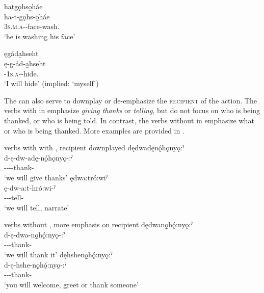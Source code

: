 \ea\label{ex:rflsrfex6} 
\ea hatgǫhso̱háe\\
\gll ha-t-gǫhs-o̱háe\\
 \textsc{3s.m.a}-{\semireflexive}-face-wash.{\habitual}\\
\glt `he is washing his face'


\ex ęgáda̱hseht\\
\gll ę-g-ád-a̱hseht\\
\fut-\textsc{1s.a}-{\semireflexive}-hide.{\zeropunctual}\\
\glt ‘I will hide’ (implied: ‘myself’)\\

\z
\z

The  \textsc{\semireflexive} can also serve to downplay or de-emphasize the \textsc{recipient} of the action. The verbs with  in  emphasize \emph{giving thanks} or \emph{telling}, but do not focus on who is being thanked, or who is being told. In contrast, the verbs without  in  emphasize what or who is being thanked. More examples are provided in .
	
\ea\label{ex:rflsrfex10} verbs with with  {\semireflexive}, recipient downplayed
\ea dędwadęnǫ́hǫnyǫ:ˀ\\
\gll d-ę-dw-adę-nǫ́hǫnyǫ-:ˀ\\
 {\dualic}-{\future}--{\semireflexive}-thank-{\punctual}\\
\glt `we will give thanks'
\ex ędwa:tró:wiˀ\\
\gll ę-dw-a:t-hró:wi-ˀ\\
 \fut--{\semireflexive}-tell-{\punctual}\\
\glt `we will tell, narrate'
\z
\z

\ea\label{ex:rflsrfex11} verbs without  {\semireflexive}, more emphasis on recipient
\ea dędwanǫ̱hǫ́:nyǫ:ˀ\\
\gll d-ę-dwa-nǫ̱hǫ́:nyǫ-:ˀ\\
 {\dualic}-{\future}--thank-{\punctual}\\
\glt `we will thank it'
\ex dęhshenǫ̱hǫ́:nyǫ:ˀ\\
\gll d-ę-hshe-nǫ̱hǫ́:nyǫ-:ˀ\\
 {\dualic}-{\future}--thank-{\punctual}\\
\glt `you will welcome, greet or thank someone'
\z
\z

